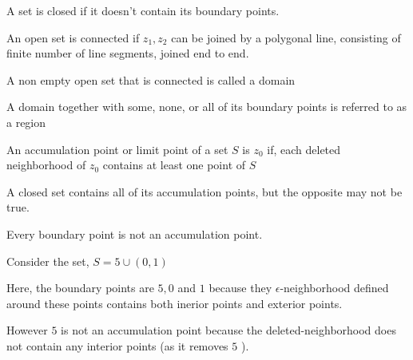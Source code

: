 \begin{definition}
   A set is closed if it doesn't contain its boundary points.
\end{definition}

\begin{definition}
   An open set is connected if $z_1, z_2$ can be joined by a polygonal line, consisting of finite number of line segments, joined end to end.
\end{definition}


\begin{definition}[domain]
   A non empty open set that is connected is called a domain
\end{definition}

\begin{definition}[region]
   A domain together with some, none, or all of its boundary points is referred to as a region
\end{definition}


\begin{definition} An accumulation point or limit point of a set $S$ is  $z_0$ if, each deleted neighborhood of $z_0$ contains at least one point of $S$
\end{definition}
\begin{remark}
   A closed set contains all of its accumulation points, but the opposite may not be true.
\end{remark}
\begin{remark}
   Every boundary point is not an accumulation point.
\end{remark}
\begin{eg}
   Consider the set, $S = {5} \cup (0,1)$

   Here, the boundary points are $5,0$ and $1$ because they  $\epsilon$-neighborhood defined around these points contains both inerior points and exterior points.

   However $5$ is not an accumulation point because the deleted-neighborhood does not contain any interior points (as it removes  $5$ ).
\end{eg}

